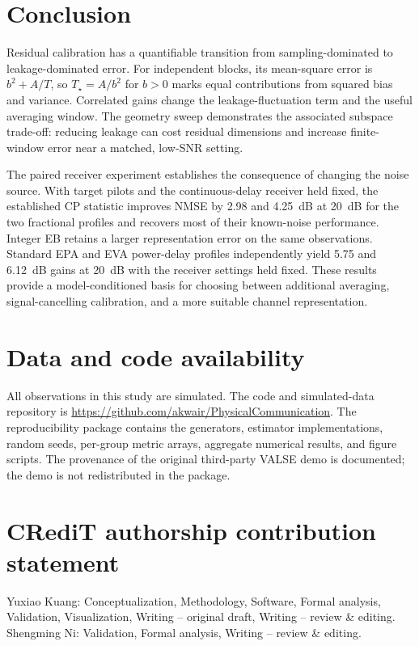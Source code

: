 \documentclass[preprint,11pt]{elsarticle}
\begin{document}
\section{Conclusion}
Residual calibration has a quantifiable transition from sampling-dominated
to leakage-dominated error. For independent blocks, its mean-square error
is $b^2+A/T$, so $T_\star=A/b^2$ for $b>0$ marks equal contributions from squared bias
and variance. Correlated gains change the leakage-fluctuation term and the
useful averaging window. The geometry sweep demonstrates the associated
subspace trade-off: reducing leakage can cost residual dimensions and increase
finite-window error near a matched, low-SNR setting.

The paired receiver experiment establishes the consequence of changing the
noise source. With target pilots and the continuous-delay receiver held
fixed, the established CP statistic improves NMSE by 2.98 and 4.25~dB at
20~dB for the two fractional profiles and recovers most of their known-noise
performance. Integer EB retains a larger representation error on the same
observations. Standard EPA and EVA power-delay profiles independently yield
5.75 and 6.12~dB gains at 20~dB with the receiver settings held fixed.
These results provide a model-conditioned basis for choosing
between additional averaging, signal-cancelling calibration, and a more
suitable channel representation.



\section*{Data and code availability}
All observations in this study are simulated. The code and simulated-data
repository is \url{https://github.com/akwair/PhysicalCommunication}.
The reproducibility package contains the generators, estimator implementations,
random seeds, per-group metric arrays, aggregate numerical results, and figure
scripts. The provenance of the original third-party VALSE demo is documented;
the demo is not redistributed in the package.

\section*{CRediT authorship contribution statement}
Yuxiao Kuang: Conceptualization, Methodology, Software, Formal analysis,
Validation, Visualization, Writing -- original draft, Writing -- review
\& editing. Shengming Ni: Validation, Formal analysis, Writing -- review
\& editing.
\end{document}
